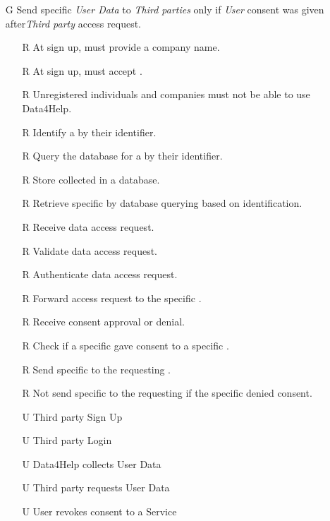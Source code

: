 \documentclass[../../../rasd.tex]{subfiles}
\begin{document}
\begin{itemize}
\begin{itemize}
	\end{itemize}

	\item[G\subs{2}]Send specific \textit{User Data} to \textit{Third parties} only if \textit{User} consent was given after\textit{Third party} access request.
	\begin{itemize}
		\item[R\subs{3}]At sign up,  must provide a company name.
		\item[R\subs{5}]At sign up,  must accept .
		\item[R\subs{1}]Unregistered individuals and companies must not be able to use Data4Help.
		\item[R\subs{6}]Identify a  by their identifier.
		\item[R\subs{7}]Query the database for a  by their identifier.
		\item[R\subs{11}]Store collected  in a database.
		\item[R\subs{12}]Retrieve specific  by database querying based on  identification.
		\item[R\subs{13}]Receive  data access request.
		\item[R\subs{14}]Validate  data access request.
		\item[R\subs{15}]Authenticate  data access request.
		\item[R\subs{16}]Forward  access request to the specific .
		\item[R\subs{17}]Receive  consent approval or denial.
		\item[R\subs{18}]Check if a specific  gave consent to a specific .
		\item[R\subs{19}]Send specific to the requesting .
		\item[R\subs{20}]Not send specific to the requesting  if the specific  denied consent.
		\\
		\item[U\subs{2}]Third party Sign Up
		\item[U\subs{4}]Third party Login
		\item[U\subs{5}]Data4Help collects User Data
		\item[U\subs{6}]Third party requests User Data
		\item[U\subs{11}]User revokes consent to a Service
	\end{itemize}


\end{itemize}
\end{document}
